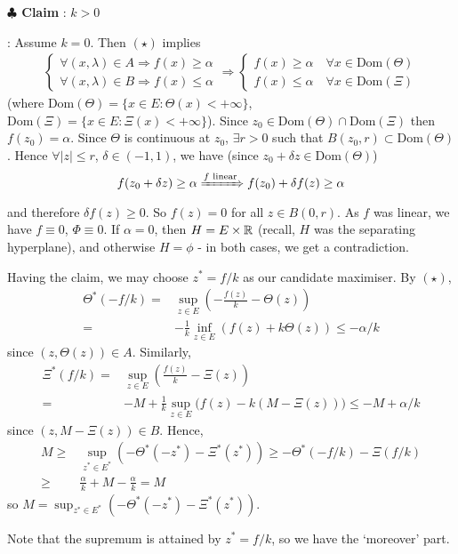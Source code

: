 \documentclass[12pt,a4paper]{article}
\newenvironment{proof}
{\begin{changemargin}{1cm}{0.5cm} 
	}%
	{\end{changemargin}
}
\newenvironment{subproof}
{\begin{changemargin}{0.5cm}{0.5cm} 
	}%
	{\end{changemargin}
}
\newenvironment{p}
{\begin{proof} 
	}%
	{\end{proof}
}
\begin{document}
\begin{p}
\textbf{$\clubsuit$ Claim} : $k>0$
\begin{subproof}
: Assume $k=0$. Then $(\star)$ implies
\begin{align*}
\begin{cases}
\forall (x, \lambda) \in A \Rightarrow f(x) \geq \alpha \\
\forall (x, \lambda) \in B \Rightarrow f(x) \leq \alpha
\end{cases} \Rightarrow \begin{cases}
f(x) \geq \alpha \quad \forall x\in \text{Dom}(\Theta)\\
f(x) \leq \alpha \quad \forall x\in \text{Dom}(\Xi)
\end{cases}
\end{align*}
(where $\text{Dom}(\Theta) = \{x\in E : \Theta(x) < + \infty \}$, $\text{Dom}(\Xi) = \{x\in E : \Xi(x) < + \infty \}$). Since $z_0 \in \text{Dom}(\Theta) \cap \text{Dom}(\Xi)$ then $f(z_0) = \alpha$. Since $\Theta$ is continuous at $z_0$, $\exists r>0$ such that $B(z_0, r) \subset \text{Dom}(\Theta)$. Hence $\forall |z| \leq r$, $\delta \in(-1,1)$, we have (since $z_0 + \delta z \in \text{Dom}(\Theta)$)
\begin{align*}
f(z_0 + \delta z) \geq \alpha \xRightarrow{f \text{ linear}} f(z_0) + \delta f(z) \geq \alpha
\end{align*}
and therefore $\delta f(z) \geq 0$. So $f(z) =0$ for all $z\in B(0, r)$. As $f$ was linear, we have $f\equiv 0$, $\Phi\equiv 0$. If $\alpha =0$, then $H = E\times \mathbb{R}$ (recall, $H$ was the separating hyperplane), and otherwise $H = \phi$ - in both cases, we get a contradiction.
\end{subproof}
Having the claim, we may choose $z^* = f/k$ as our candidate maximiser. By $(\star)$,
\begin{align*}
\Theta^* (-f/k) =& \sup_{z\in E}(- \frac{f(z)}{k} - \Theta(z)) \\
= & -\frac{1}{k} \inf_{z\in E} (f(z) + k\Theta (z)) \leq -\alpha /k
\end{align*}
since $(z, \Theta(z)) \in A$. Similarly,
\begin{align*}
\Xi^*(f/k) =& \sup_{z\in E} (\frac{f(z)}{k} - \Xi(z)) \\
=& -M + \frac{1}{k}\sup_{z\in E} \big( f(z) - k (M -\Xi(z)) \big) \leq -M + \alpha/k
\end{align*}
since $(z, M- \Xi(z)) \in B$. Hence,
\begin{align*}
M \geq & \sup_{z^* \in E^*} (-\Theta^*(-z^*) - \Xi^*(z^*)) \geq - \Theta^*(-f/k) - \Xi(f/k) \\
\geq & \frac{\alpha}{k} + M - \frac{\alpha}{k} = M
\end{align*}
so $M =\sup_{z^* \in E^*} (-\Theta^*(-z^*) - \Xi^*(z^*))$.
\s

Note that the supremum is attained by $z^* = f/k$, so we have the `moreover' part.

\eop
\end{p}
\s
\end{document}
